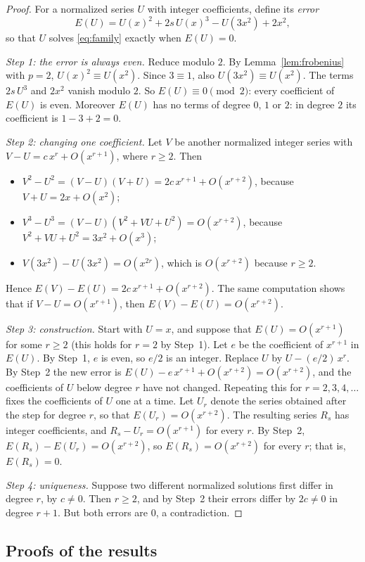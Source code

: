 \documentclass[11pt,a4paper]{article}
\theoremstyle{definition}
\theoremstyle{remark}
\begin{document}
\begin{proof}
For a normalized series $U$ with integer coefficients, define its \emph{error}
\[
E(U)=U(x)^2+2s\,U(x)^3-U(3x^2)+2x^2 ,
\]
so that $U$ solves \eqref{eq:family} exactly when $E(U)=0$.

\emph{Step 1: the error is always even.} Reduce modulo $2$. By Lemma~\ref{lem:frobenius} with $p=2$,
$U(x)^2\equiv U(x^2)$. Since $3\equiv1$, also $U(3x^2)\equiv U(x^2)$. The terms $2s\,U^3$ and $2x^2$ vanish modulo $2$.
So $E(U)\equiv0\pmod2$: every coefficient of $E(U)$ is even. Moreover $E(U)$ has no terms of degree $0$, $1$ or $2$:
in degree $2$ its coefficient is $1-3+2=0$.

\emph{Step 2: changing one coefficient.} Let $V$ be another normalized integer series with
$V-U=c\,x^r+O(x^{r+1})$, where $r\ge2$. Then
\begin{itemize}
\item $V^2-U^2=(V-U)(V+U)=2c\,x^{r+1}+O(x^{r+2})$, because $V+U=2x+O(x^2)$;
\item $V^3-U^3=(V-U)(V^2+VU+U^2)=O(x^{r+2})$, because $V^2+VU+U^2=3x^2+O(x^3)$;
\item $V(3x^2)-U(3x^2)=O(x^{2r})$, which is $O(x^{r+2})$ because $r\ge2$.
\end{itemize}
Hence $E(V)-E(U)=2c\,x^{r+1}+O(x^{r+2})$. The same computation shows that if $V-U=O(x^{r+1})$, then
$E(V)-E(U)=O(x^{r+2})$.

\emph{Step 3: construction.} Start with $U=x$, and suppose that $E(U)=O(x^{r+1})$ for some $r\ge2$ (this holds for
$r=2$ by Step~1). Let $e$ be the coefficient of $x^{r+1}$ in $E(U)$. By Step~1, $e$ is even, so $e/2$ is an integer.
Replace $U$ by $U-(e/2)\,x^r$. By Step~2 the new error is $E(U)-e\,x^{r+1}+O(x^{r+2})=O(x^{r+2})$, and the coefficients
of $U$ below degree $r$ have not changed. Repeating this for $r=2,3,4,\dots$ fixes the coefficients of $U$ one at a
time. Let $U_r$ denote the series obtained after the step for degree $r$, so that $E(U_r)=O(x^{r+2})$. The
resulting series $R_s$ has integer coefficients, and $R_s-U_r=O(x^{r+1})$ for every $r$. By Step~2,
$E(R_s)-E(U_r)=O(x^{r+2})$, so $E(R_s)=O(x^{r+2})$ for every $r$; that is, $E(R_s)=0$.

\emph{Step 4: uniqueness.} Suppose two different normalized solutions first differ in degree $r$, by $c\ne0$. Then
$r\ge2$, and by Step~2 their errors differ by $2c\ne0$ in degree $r+1$. But both errors are $0$, a contradiction.
\end{proof}

\subsection{Proofs of the results}
\end{document}
